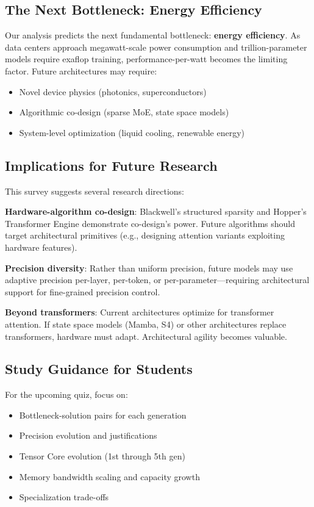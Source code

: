 \documentclass{article}
\begin{document}
\subsection{The Next Bottleneck: Energy Efficiency}

Our analysis predicts the next fundamental bottleneck: \textbf{energy efficiency}. As data centers approach megawatt-scale power consumption and trillion-parameter models require exaflop training, performance-per-watt becomes the limiting factor. Future architectures may require:
\begin{itemize}
\item Novel device physics (photonics, superconductors)
\item Algorithmic co-design (sparse MoE, state space models)
\item System-level optimization (liquid cooling, renewable energy)
\end{itemize}

\subsection{Implications for Future Research}

This survey suggests several research directions:

\textbf{Hardware-algorithm co-design}: Blackwell's structured sparsity and Hopper's Transformer Engine demonstrate co-design's power. Future algorithms should target architectural primitives (e.g., designing attention variants exploiting hardware features).

\textbf{Precision diversity}: Rather than uniform precision, future models may use adaptive precision per-layer, per-token, or per-parameter—requiring architectural support for fine-grained precision control.

\textbf{Beyond transformers}: Current architectures optimize for transformer attention. If state space models (Mamba, S4) or other architectures replace transformers, hardware must adapt. Architectural agility becomes valuable.

\subsection{Study Guidance for Students}

For the upcoming quiz, focus on:
\begin{itemize}
\item Bottleneck-solution pairs for each generation
\item Precision evolution and justifications
\item Tensor Core evolution (1st through 5th gen)
\item Memory bandwidth scaling and capacity growth
\item Specialization trade-offs
\end{itemize}
\end{document}

